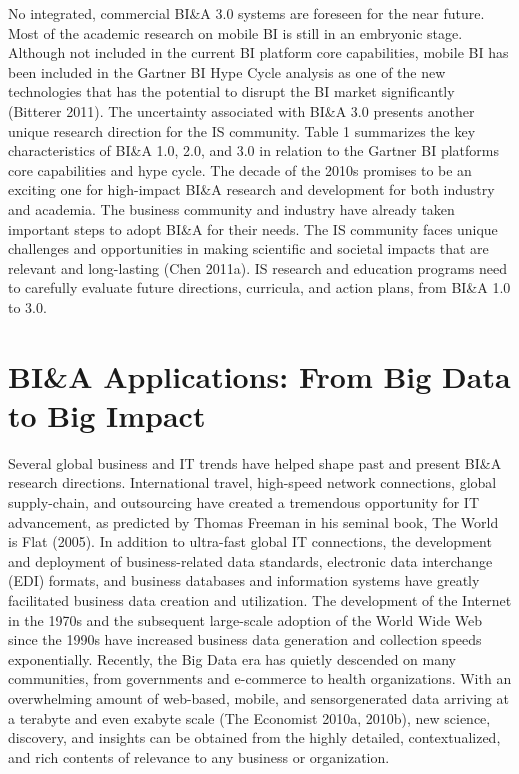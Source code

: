 No integrated, commercial BI\&A 3.0 systems are foreseen for
the near future. Most of the academic research on mobile BI
is still in an embryonic stage. Although not included in the
current BI platform core capabilities, mobile BI has been
included in the Gartner BI Hype Cycle analysis as one of the
new technologies that has the potential to disrupt the BI
market significantly (Bitterer 2011). The uncertainty associated
with BI\&A 3.0 presents another unique research
direction for the IS community.
Table 1 summarizes the key characteristics of BI\&A 1.0, 2.0,
and 3.0 in relation to the Gartner BI platforms core capabilities
and hype cycle.
The decade of the 2010s promises to be an exciting one for
high-impact BI\&A research and development for both industry
and academia. The business community and industry have
already taken important steps to adopt BI\&A for their needs.
The IS community faces unique challenges and opportunities
in making scientific and societal impacts that are relevant and
long-lasting (Chen 2011a). IS research and education programs
need to carefully evaluate future directions, curricula,
and action plans, from BI\&A 1.0 to 3.0.

\section*{BI\&A Applications: From Big Data to Big Impact}

Several global business and IT trends have helped shape past
and present BI\&A research directions. International travel,
high-speed network connections, global supply-chain, and
outsourcing have created a tremendous opportunity for IT
advancement, as predicted by Thomas Freeman in his seminal
book, The World is Flat (2005). In addition to ultra-fast
global IT connections, the development and deployment of
business-related data standards, electronic data interchange
(EDI) formats, and business databases and information
systems have greatly facilitated business data creation and
utilization. The development of the Internet in the 1970s and
the subsequent large-scale adoption of the World Wide Web
since the 1990s have increased business data generation and
collection speeds exponentially. Recently, the Big Data era
has quietly descended on many communities, from governments
and e-commerce to health organizations. With an
overwhelming amount of web-based, mobile, and sensorgenerated
data arriving at a terabyte and even exabyte scale
(The Economist 2010a, 2010b), new science, discovery, and
insights can be obtained from the highly detailed, contextualized,
and rich contents of relevance to any business or
organization.

